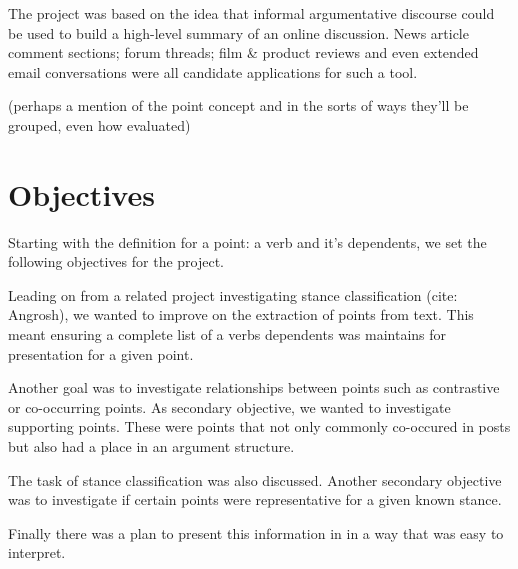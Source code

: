     The project was based on the idea that informal argumentative discourse could be used to build a high-level summary of an online discussion. News article comment sections; forum threads; film \& product reviews and even extended email conversations were all candidate applications for such a tool.

    (perhaps a mention of the point concept and in the sorts of ways they'll be grouped, even how evaluated)

  \section{Objectives}
    Starting with the definition for a point: a verb and it's dependents, we set the following objectives for the project.

    Leading on from a related project investigating stance classification (cite: Angrosh), we wanted to improve on the extraction of points from text. This meant ensuring a complete list of a verbs dependents was maintains for presentation for a given point.

    Another goal was to investigate relationships between points such as contrastive or co-occurring points. As secondary objective, we wanted to investigate supporting points. These were points that not only commonly co-occured in posts but also had a place in an argument structure.

    The task of stance classification was also discussed. Another secondary objective was to investigate if certain points were representative for a given known stance.

    Finally there was a plan to present this information in in a way that was easy to interpret.
